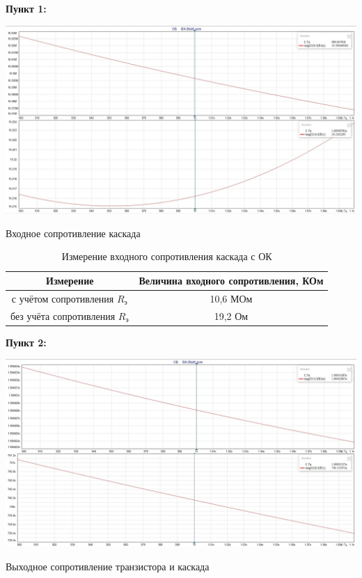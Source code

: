 \documentclass[a4paper,14pt]{extarticle}
\begin{document}
    \newpage
    \textbf{Пункт 1:}
    \begin{center}
        \includegraphics[scale=0.25]{1.jpg}
    \end{center}
    \begin{center}
        Входное сопротивление каскада 
    \end{center}
    \begin{table}[ht]
        \begin{center}
            \caption{Измерение входного сопротивления каскада с ОК}
            \begin{tabular}{ |c|c| }
                \hline
                Измерение & Величина входного сопротивления, КОм\\
                \hline
                с учётом сопротивления $R_{\text{э}}$ & 10,6 МОм\\
                \hline
                без учёта сопротивления $R_{\text{э}}$ & 19,2 Ом\\
                \hline
            \end{tabular}
        \end{center}
    \end{table}

    \newpage
    \textbf{Пункт 2:}
    \begin{center}
        \includegraphics[scale=0.25]{2.jpg}
    \end{center}
    \begin{center}
        Выходное сопротивление транзистора и каскада
    \end{center}
\end{document}
